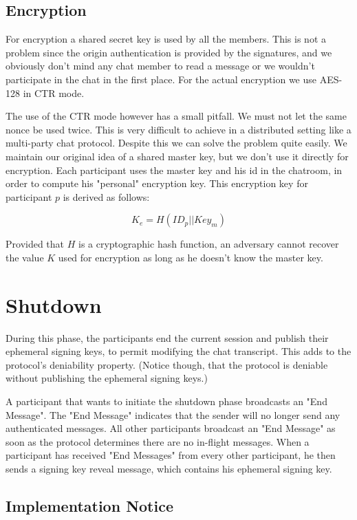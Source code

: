 \documentclass[12pt,titlepage,a4paper]{article}
\begin{document}
{\subsection{Encryption}

For encryption a shared secret key is used by all the members. This is not a
problem since the origin authentication is provided by the signatures, and
we obviously don't mind any chat member to read a message or we wouldn't
participate in the chat in the first place. For the actual encryption we
use AES-128 in CTR mode.

The use of the CTR mode however has a small pitfall. We must not let the same
nonce be used twice. This is very difficult to achieve in a distributed setting
like a multi-party chat protocol. Despite this we can solve the problem quite
easily. We maintain our original idea of a shared master key, but we don't use
it directly for encryption. Each participant uses the master key and his id in
the chatroom, in order to compute his "personal" encryption key. This encryption
key for participant $p$ is derived as follows:

\[
    K_e = H(ID_p || Key_m)
\]

Provided that $H$ is a cryptographic hash function, an adversary cannot recover
the value $K$ used for encryption as long as he doesn't know the master key.
}
\section{Shutdown}

During this phase, the participants end the current session and publish their
ephemeral signing keys, to permit modifying the chat transcript. This adds to
the protocol's deniability property. (Notice though, that the protocol is
deniable without publishing the ephemeral signing keys.)

A participant that wants to initiate the shutdown phase broadcasts an
"End Message". The "End Message" indicates that the sender will no longer send
any authenticated messages. All other participants broadcast an "End Message"
as soon as the protocol determines there are no in-flight messages. When a
participant has received "End Messages" from every other participant, he then
sends a signing key reveal message, which contains his ephemeral signing key.

\subsection{Implementation Notice}
\end{document}
